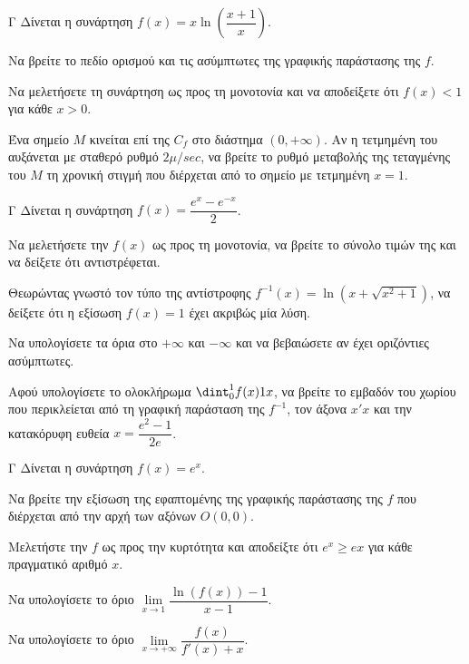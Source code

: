 \begin{thema}{Γ}
Δίνεται η συνάρτηση $f(x) = x \ln\left(\dfrac{x+1}{x}\right)$.
\begin{erwthma}
  \item Να βρείτε το πεδίο ορισμού και τις ασύμπτωτες της γραφικής παράστασης της $f$.
  \item Να μελετήσετε τη συνάρτηση ως προς τη μονοτονία και να αποδείξετε ότι $f(x) < 1$ για κάθε $x > 0$.
  \item Ένα σημείο $M$ κινείται επί της $C_f$ στο διάστημα $(0, +\infty)$. Αν η τετμημένη του αυξάνεται με σταθερό ρυθμό $2 \mu/\si{sec}$, να βρείτε το ρυθμό μεταβολής της τεταγμένης του $M$ τη χρονική στιγμή που διέρχεται από το σημείο με τετμημένη $x=1$.
\end{erwthma}
\end{thema}

\begin{thema}{Γ}
Δίνεται η συνάρτηση $f(x) = \dfrac{e^x - e^{-x}}{2}$. 
\begin{erwthma}
  \item Να μελετήσετε την $f(x)$ ως προς τη μονοτονία, να βρείτε το σύνολο τιμών της και να δείξετε ότι αντιστρέφεται.
  \item Θεωρώντας γνωστό τον τύπο της αντίστροφης $f^{-1}(x) = \ln(x + \sqrt{x^2+1})$, να δείξετε ότι η εξίσωση $f(x) = 1$ έχει ακριβώς μία λύση.
  \item Να υπολογίσετε τα όρια στο $+\infty$ και $-\infty$ και να βεβαιώσετε αν έχει οριζόντιες ασύμπτωτες.
  \item Αφού υπολογίσετε το ολοκλήρωμα $\dint_0^1 f(x) \d x$, να βρείτε το εμβαδόν του χωρίου που περικλείεται από τη γραφική παράσταση της $f^{-1}$, τον άξονα $x'x$ και την κατακόρυφη ευθεία $x = \dfrac{e^2-1}{2e}$.
\end{erwthma}
\end{thema}

\begin{thema}{Γ}
Δίνεται η συνάρτηση $f(x) = e^x$.
\begin{erwthma}
  \item Να βρείτε την εξίσωση της εφαπτομένης της γραφικής παράστασης της $f$ που διέρχεται από την αρχή των αξόνων $O(0,0)$.
  \item Μελετήστε την $f$ ως προς την κυρτότητα και αποδείξτε ότι $e^x \ge ex$ για κάθε πραγματικό αριθμό $x$.
  \item Να υπολογίσετε το όριο $\lim\limits_{x \to 1} \dfrac{\ln(f(x)) - 1}{x - 1}$.
  \item Να υπολογίσετε το όριο $\lim\limits_{x \to +\infty} \dfrac{f(x)}{f'(x) + x}$.
\end{erwthma}
\end{thema}

